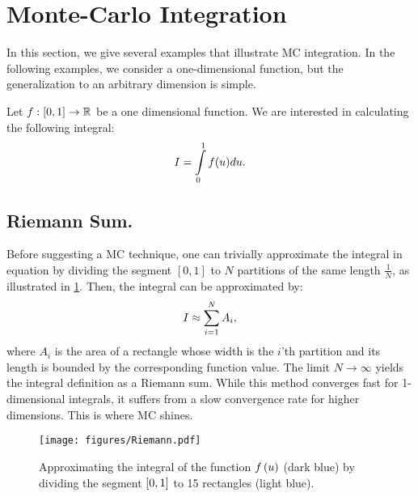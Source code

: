 \documentclass{article}
\begin{document}

\newpage
\appendix
\section{Monte-Carlo Integration}
\label{sec:Monte-Carlo}
In this section, we give several examples that illustrate \ac{MC} integration. In the following examples, we consider a one-dimensional function, but the generalization to an arbitrary dimension is simple.

Let $f:\left[{0,1}\right]\rightarrow \mathbb{R} $ be a one dimensional function. We are interested in calculating the following integral:
\begin{equation}
\label{eq:one_d_integral}
I = \intop_0^1{f(\mcpar)d\mcpar}.
\end{equation}
\subsection{Riemann Sum.}
Before suggesting a \ac{MC} technique, one can trivially approximate the integral in equation \eq{\ref{eq:one_d_integral}} by dividing the segment $[0,1]$ to $N$ partitions of the same length $\frac{1}{N}$, as illustrated in \fig\ref{fig:riemann}. Then, the integral can be approximated by:
\begin{equation}
\label{eq:one_d_sum}
I \approx \sum_{i=1}^N{A_i},
\end{equation}
where $A_i$ is the area of a rectangle whose width is the $i$'th partition and its length is bounded by the corresponding function value.
The limit $N\rightarrow \infty$ yields the integral definition as a Riemann sum. While this method converges fast for 1-dimensional integrals, it suffers from a slow convergence rate for higher dimensions. This is where \ac{MC} shines. 
\begin{figure}[t]
  \centering
  \texttt{[image: figures/Riemann.pdf]}
    \caption{Approximating the integral of the function $f\left({u}\right)$ (dark blue) by dividing the segment $\left[{0,1}\right]$ to 15 rectangles (light blue).}
    \label{fig:riemann}
\end{figure}
\end{document}

